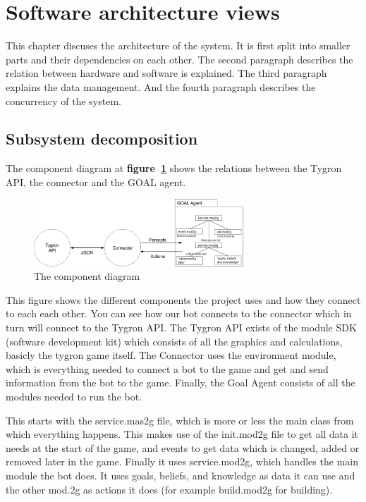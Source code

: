 \label{Software architecture views}
\section{Software architecture views}
This chapter discuses the architecture of the system. It is first split into smaller parts and their dependencies on each other. The second paragraph describes the relation between hardware and software is explained. The third paragraph explains the data management. And the fourth paragraph describes the concurrency of the system.

\subsection{Subsystem decomposition}

The component diagram at \textbf{figure~\ref{fig:comp_diag}} shows the relations between the Tygron API, the connector and the GOAL agent. 

\begin{figure}[h]
	  \centering
	  \includegraphics[width=0.7\textwidth]{system_decomposition}
	  \caption{The component diagram}
	  \label{fig:comp_diag}
\end{figure}
This figure shows the different components the project uses and how they connect to each each other. You can see how our bot connects to the connector which in turn will connect to the Tygron API. The Tygron API exists of the module SDK (software development kit) which consists of all the graphics and calculations, basicly the tygron game itself. The Connector uses the environment module, which is everything needed to connect a bot to the game and get and send information from the bot to the game. Finally, the Goal Agent consists of all the modules needed to run the bot.

This starts with the service.mas2g file, which is more or less the main class from which everything happens. This makes use of the init.mod2g file to get all data it needs at the start of the game, and events to get data which is changed, added or removed later in the game. Finally it uses service.mod2g, which handles the main module the bot does. It uses goals, beliefs, and knowledge as data it can use and the other mod.2g as actions it does (for example build.mod2g for building).

